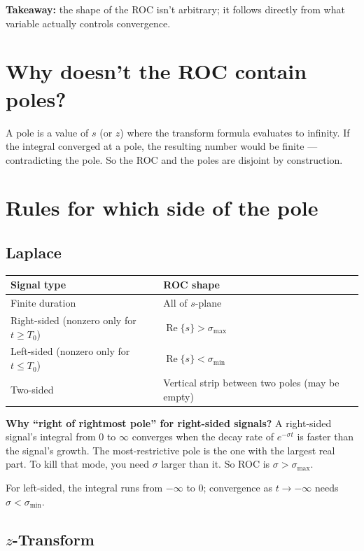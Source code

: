 \documentclass[11pt]{article}
\begin{document}
\textbf{Takeaway:} the shape of the ROC isn't arbitrary; it follows directly from what variable actually controls convergence.

\section{Why doesn't the ROC contain poles?}

A pole is a value of $s$ (or $z$) where the transform formula evaluates to infinity. If the integral converged at a pole, the resulting number would be finite --- contradicting the pole. So the ROC and the poles are disjoint by construction.

\section{Rules for which side of the pole}

\subsection{Laplace}

\begin{center}
\begin{tabular}{@{}l l@{}}
\toprule
Signal type & ROC shape \\
\midrule
Finite duration & All of $s$-plane \\
Right-sided (nonzero only for $t \ge T_0$) & $\operatorname{Re}\{s\} > \sigma_{\max}$ \\
Left-sided (nonzero only for $t \le T_0$) & $\operatorname{Re}\{s\} < \sigma_{\min}$ \\
Two-sided & Vertical strip between two poles (may be empty) \\
\bottomrule
\end{tabular}
\end{center}

\textbf{Why ``right of rightmost pole'' for right-sided signals?} A right-sided signal's integral from $0$ to $\infty$ converges when the decay rate of $e^{-\sigma t}$ is faster than the signal's growth. The most-restrictive pole is the one with the largest real part. To kill that mode, you need $\sigma$ larger than it. So ROC is $\sigma > \sigma_{\max}$.

For left-sided, the integral runs from $-\infty$ to $0$; convergence as $t \to -\infty$ needs $\sigma < \sigma_{\min}$.

\subsection{$z$-Transform}
\end{document}
